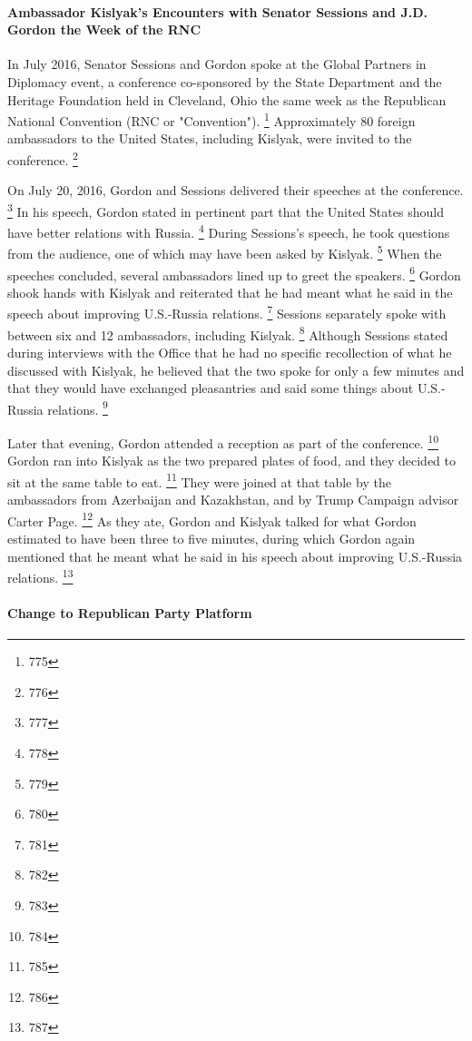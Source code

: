 \paragraph{Ambassador Kislyak's Encounters with Senator Sessions and J.D. Gordon the Week of the RNC}

In July 2016, Senator Sessions and Gordon spoke at the Global Partners in Diplomacy event, a conference co-sponsored by the State Department and the Heritage Foundation held in Cleveland, Ohio the same week as the Republican National Convention (RNC or "Convention").%
\footnote{775}
Approximately 80 foreign ambassadors to the United States, including Kislyak, were invited to the conference.%
\footnote{776}

On July 20, 2016, Gordon and Sessions delivered their speeches at the conference.%
\footnote{777}
In his speech, Gordon stated in pertinent part that the United States should have better relations with Russia.%
\footnote{778}
During Sessions's speech, he took questions from the audience, one of which may have been asked by Kislyak.%
\footnote{779}
When the speeches concluded, several ambassadors lined up to greet the speakers.%
\footnote{780}
Gordon shook hands with Kislyak and reiterated that he had meant what he said in the speech about improving U.S.-Russia relations.%
\footnote{781}
Sessions separately spoke with between six and 12 ambassadors, including Kislyak.%
\footnote{782}
Although Sessions stated during interviews with the Office that he had no specific recollection of what he discussed with Kislyak, he believed that the two spoke for only a few minutes and that they would have exchanged pleasantries and said some things about U.S.-Russia relations.%
\footnote{783}

Later that evening, Gordon attended a reception as part of the conference.%
\footnote{784}
Gordon ran into Kislyak as the two prepared plates of food, and they decided to sit at the same table to eat.%
\footnote{785}
They were joined at that table by the ambassadors from Azerbaijan and Kazakhstan, and by Trump Campaign advisor Carter Page.%
\footnote{786}
As they ate, Gordon and Kislyak talked for what Gordon estimated to have been three to five minutes, during which Gordon again mentioned that he meant what he said in his speech about improving U.S.-Russia relations.%
\footnote{787}

\paragraph{Change to Republican Party Platform}

